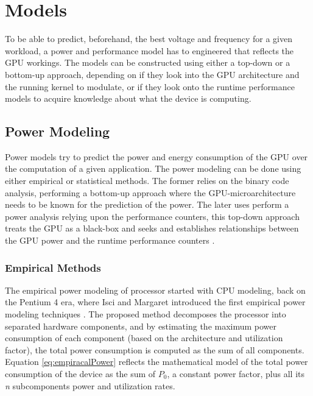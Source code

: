  



\section{Models}
\label{section:Models}
To be able to predict, beforehand, the best voltage and frequency for a given workload, a power and performance model has to engineered that reflects the GPU workings. The models can be constructed using either a top-down or a bottom-up approach, depending on if they look into the GPU architecture and the running kernel to modulate, or if they look onto the runtime performance models to acquire knowledge about what the device is computing.

\subsection{Power Modeling}
\label{subsection:powermodels}

Power models try to predict the power and energy consumption of the GPU over the computation of a given application. The power modeling can be done using either empirical or statistical methods. The former relies on the binary code analysis, performing a bottom-up approach where the GPU-microarchitecture needs to be known for the prediction of the power. The later uses perform a power analysis relying upon the performance counters, this top-down approach treats the GPU as a black-box and seeks and establishes relationships between the GPU power and the runtime performance counters \cite{mei_survey_2016}.

\subsubsection{Empirical Methods}
\label{subsubsection:EmpiricalMethods}
The empirical power modeling of processor started with CPU modeling, back on the Pentium 4 era, where Isci and Margaret introduced the first empirical power modeling techniques \cite{isci_runtime_2003}. The proposed method decomposes the processor into separated hardware components, and by estimating the maximum power consumption of each component (based on the architecture and utilization factor), the total power consumption is computed as the sum of all components. Equation \ref{eq:empiracalPower} reflects the mathematical model of the total power consumption of the device as the sum of $P_0$, a constant power factor, plus all its \textit{n} subcomponents power and utilization rates. 

